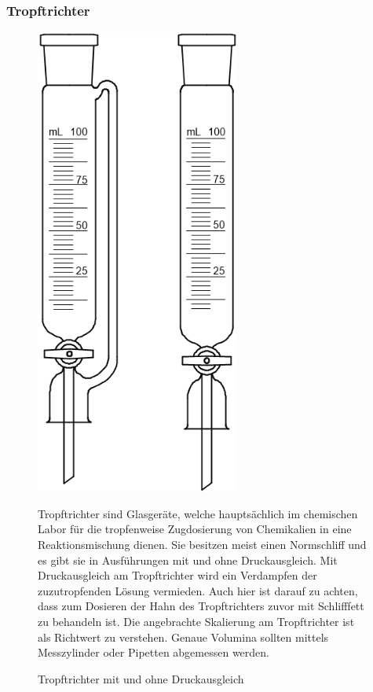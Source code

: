 \subsubsection*{Tropftrichter} 
 \begin{figure}[h!]
 	\begin{minipage}[t]{0.30\textwidth}
 		\vspace{0pt}
 		\centering
 		\includegraphics[width=0.6\textwidth]{img/tropftrichter}
 		\caption{Tropftrichter mit und ohne Druckausgleich}
 		\label{fig:tropftrichter}
 	\end{minipage}
 	\hfill
 	\hspace{1mm}
 	\begin{minipage}[t]{0.7\textwidth}
 		\vspace{0pt}
 		Tropftrichter sind Glasgeräte, welche hauptsächlich im chemischen Labor für die tropfenweise Zugdosierung von Chemikalien in eine Reaktionsmischung dienen. Sie besitzen meist einen Normschliff und es gibt sie in Ausführungen mit und ohne Druckausgleich. Mit Druckausgleich am Tropftrichter wird ein Verdampfen der zuzutropfenden Lösung vermieden. Auch hier ist darauf zu achten, dass zum Dosieren der Hahn des Tropftrichters zuvor mit Schlifffett zu behandeln ist. Die angebrachte Skalierung am Tropftrichter ist als Richtwert zu verstehen. Genaue Volumina sollten mittels Messzylinder oder Pipetten abgemessen werden.
 	\end{minipage}
 \end{figure}
 \FloatBarrier
 
